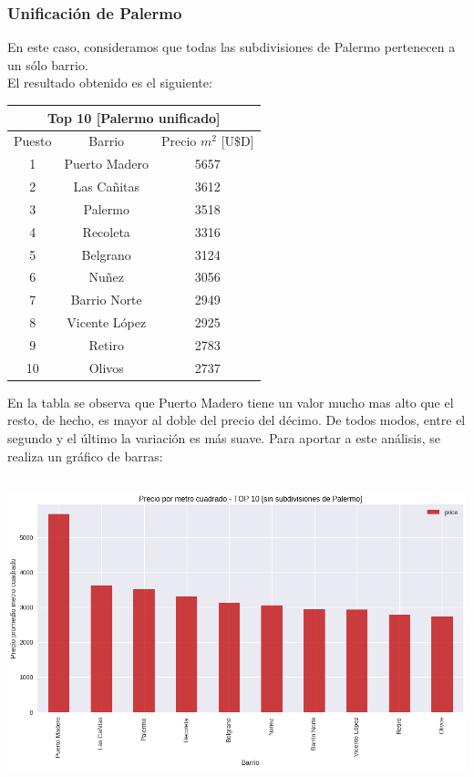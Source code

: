 \documentclass[a4paper, 10pt]{article}
\newcommand\tab[1][0.5cm]{\hspace*{#1}}
\begin{document}
				\subsubsection{Unificación de Palermo}
					En este caso, consideramos que todas las subdivisiones de Palermo pertenecen a un sólo barrio.\\
					\tab El resultado obtenido es el siguiente:
					\begin{center}
						\begin{tabular}{ |c|c|c| }
							\hline
							\multicolumn{3}{|c|}{Top 10 [Palermo unificado]}\\
							\hline
							Puesto & Barrio & Precio $m^2$ [U$\$$D] \\
							\hline
							1 & Puerto Madero & 5657 \\
							2 & Las Cañitas & 3612 \\
							3 & Palermo & 3518 \\
							4 & Recoleta & 3316 \\
							5 & Belgrano & 3124 \\
							6 & Nuñez & 3056 \\
							7 & Barrio Norte & 2949 \\
							8 & Vicente López & 2925 \\
							9 & Retiro & 2783 \\
							10 & Olivos & 2737 \\
							\hline
						\end{tabular}
					\end{center}
					\tab En la tabla se observa que Puerto Madero tiene un valor mucho mas alto que el resto, de hecho, es
					mayor al doble del precio del décimo. De todos modos, entre el segundo y el último la variación es más
					suave. Para aportar a este análisis, se realiza un gráfico de barras:
					\begin{center}
   	    					\includegraphics[width=7in, height=3.5in]{images/m2UnifiedTop10}
			  		\end{center}	
\end{document}
